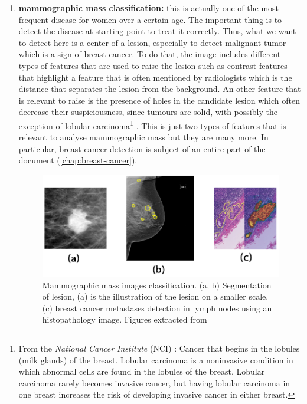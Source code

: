 \documentclass[11pt, openany]{report}
\theoremstyle{plain}
\theoremstyle{definition}
\theoremstyle{remark}
\begin{document}
\begin{enumerate}
\item \textbf{mammographic mass classification:} this is actually one of the most frequent disease for women over a certain age. The important thing is to detect the disease at starting point to treat it correctly. Thus, what we want to detect here is a center of a lesion, especially to detect malignant tumor which is a sign of breast cancer.  To do that, the image includes different types of features that are used to raise the lesion such as contrast features that highlight a feature that is often mentioned by radiologists which is the distance that separates the lesion from the background. An other feature that is relevant to raise is the presence of holes in the candidate lesion which often decrease their suspiciousness, since tumours are solid, with possibly the exception of lobular carcinoma\footnote{From the \textit{National Cancer Institute} (NCI) \cite{NCI}: Cancer that begins in the lobules (milk glands) of the breast. Lobular carcinoma is a noninvasive condition in which abnormal cells are found in the lobules of the breast. Lobular carcinoma rarely becomes invasive cancer, but having lobular carcinoma in one breast increases the risk of developing invasive cancer in either breast.} \cite{breast-cancer-2}. This is just two types of features that is relevant to analyse mammographic mass but they are many more.  In particular, breast cancer detection is subject of an entire part of the document (\autoref{chap:breast-cancer}).

\begin{figure}[h]
  \centering
  \includegraphics[scale=0.4]{figures/breast-images-examples.png}
  \caption{Mammographic mass images classification. (a, b) Segmentation of lesion, (a) is the illustration of the lesion on a smaller scale. (c) breast cancer metastases detection in lymph nodes using an histopathology image. Figures extracted from \cite{breast-cancer-2}}
  \label{fig:breast-example}
\end{figure}


\end{enumerate}
\end{document}
